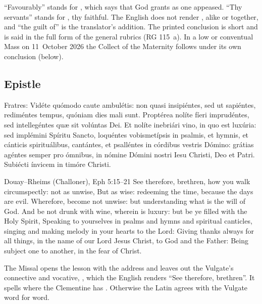 \noindent ``Favourably'' stands for , which says that God
grants as one appeased. ``Thy servants'' stands for , thy
faithful. The English does not render , alike or together, and
``the guilt of'' is the translator's addition. The printed conclusion is short and is said in the full
form of the general rubrics (RG 115~a). In a low or conventual Mass on
11~October 2026 the Collect of the Maternity follows under its own conclusion
(below).

\subsection{Epistle}
\label{proper-epistle}


\begin{latinproper}
Fratres: Vidéte quómodo caute ambulétis: non quasi insipiéntes, sed ut
sapiéntes, rediméntes tempus, quóniam dies mali sunt. Proptérea nolíte fíeri
imprudéntes, sed intellegéntes quæ sit volúntas Dei. Et nolíte inebriári vino,
in quo est luxúria: sed implémini Spíritu Sancto, loquéntes vobismetípsis in
psalmis, et hymnis, et cánticis spirituálibus, cantántes, et psalléntes in
córdibus vestris Dómino: grátias agéntes semper pro ómnibus, in nómine Dómini
nostri Iesu Christi, Deo et Patri. Subiécti ínvicem in timóre Christi.
\end{latinproper}

\begin{englishwitness}{Douay--Rheims (Challoner), Eph 5:15--21}
See therefore, brethren, how you walk circumspectly: not as unwise, But as wise:
redeeming the time, because the days are evil. Wherefore, become not unwise:
but understanding what is the will of God. And be not drunk with wine, wherein
is luxury: but be ye filled with the Holy Spirit, Speaking to yourselves in
psalms and hymns and spiritual canticles, singing and making melody in your
hearts to the Lord: Giving thanks always for all things, in the name of our Lord
Jesus Christ, to God and the Father: Being subject one to another, in the fear
of Christ.
\end{englishwitness}

\noindent The Missal opens the lesson with the address  and
leaves out the Vulgate's connective and vocative, , which the English renders ``See therefore, brethren''. It spells
 where the Clementine has . Otherwise
the Latin agrees with the Vulgate word for word.

